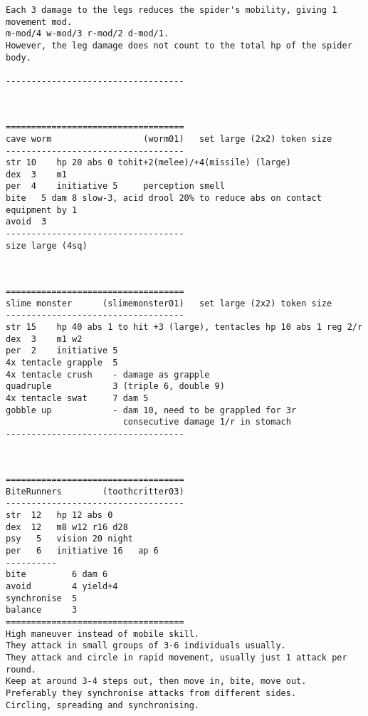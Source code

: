 \begin{samepage}
\begin{verbatim}
Each 3 damage to the legs reduces the spider's mobility, giving 1 movement mod.
m-mod/4 w-mod/3 r-mod/2 d-mod/1.
However, the leg damage does not count to the total hp of the spider body.

-----------------------------------
\end{verbatim} \end{samepage} \normalsize

\

\pagebreak[1]
\tiny \begin{samepage} \begin{verbatim}
===================================
cave worm                  (worm01)   set large (2x2) token size
-----------------------------------
str 10    hp 20 abs 0 tohit+2(melee)/+4(missile) (large)
dex  3    m1
per  4    initiative 5     perception smell
bite   5 dam 8 slow-3, acid drool 20% to reduce abs on contact equipment by 1
avoid  3
-----------------------------------
size large (4sq)
\end{verbatim} \end{samepage} \normalsize

\

\pagebreak[1]
\tiny \begin{samepage} \begin{verbatim}
===================================
slime monster      (slimemonster01)   set large (2x2) token size
-----------------------------------
str 15    hp 40 abs 1 to hit +3 (large), tentacles hp 10 abs 1 reg 2/r
dex  3    m1 w2
per  2    initiative 5
4x tentacle grapple  5
4x tentacle crush    - damage as grapple
quadruple            3 (triple 6, double 9)
4x tentacle swat     7 dam 5
gobble up            - dam 10, need to be grappled for 3r
                       consecutive damage 1/r in stomach
-----------------------------------
\end{verbatim} \end{samepage} \normalsize

\

\pagebreak[1]
\tiny \begin{samepage} \begin{verbatim}
===================================
BiteRunners        (toothcritter03)
-----------------------------------
str  12   hp 12 abs 0
dex  12   m8 w12 r16 d28
psy   5   vision 20 night
per   6   initiative 16   ap 6
----------
bite         6 dam 6
avoid        4 yield+4
synchronise  5
balance      3
===================================
High maneuver instead of mobile skill.
They attack in small groups of 3-6 individuals usually.
They attack and circle in rapid movement, usually just 1 attack per round.
Keep at around 3-4 steps out, then move in, bite, move out.
Preferably they synchronise attacks from different sides.
Circling, spreading and synchronising.
\end{verbatim} \end{samepage} \normalsize

